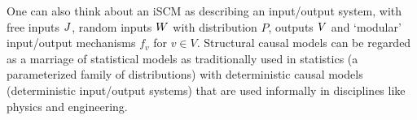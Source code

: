 One can also think about an iSCM as describing an input/output system, with free inputs
$J$, random inputs $W$ with distribution $P$, outputs $V$ and `modular' input/output mechanisms $f_v$ for $v \in V$.
Structural causal models can be regarded as a marriage of statistical models as traditionally used in statistics (a parameterized family of distributions) with deterministic causal models (deterministic input/output systems) that are used informally in disciplines like physics and engineering.

